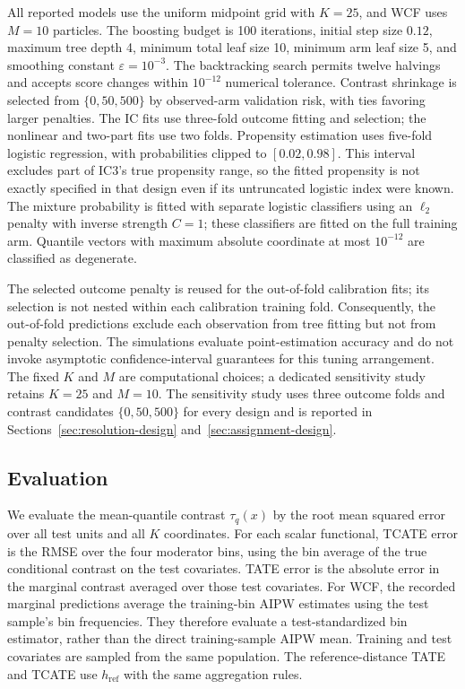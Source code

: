 \documentclass[11pt]{article}
\begin{document}
All reported models use the uniform midpoint grid with $K=25$, and WCF uses $M=10$ particles. The boosting budget is 100 iterations, initial step size $0.12$, maximum tree depth 4, minimum total leaf size 10, minimum arm leaf size 5, and smoothing constant $\varepsilon=10^{-3}$. The backtracking search permits twelve halvings and accepts score changes within $10^{-12}$ numerical tolerance. Contrast shrinkage is selected from $\{0,50,500\}$ by observed-arm validation risk, with ties favoring larger penalties. The IC fits use three-fold outcome fitting and selection; the nonlinear and two-part fits use two folds. Propensity estimation uses five-fold logistic regression, with probabilities clipped to $[0.02,0.98]$. This interval excludes part of IC3's true propensity range, so the fitted propensity is not exactly specified in that design even if its untruncated logistic index were known. The mixture probability is fitted with separate logistic classifiers using an $\ell_2$ penalty with inverse strength $C=1$; these classifiers are fitted on the full training arm. Quantile vectors with maximum absolute coordinate at most $10^{-12}$ are classified as degenerate.

The selected outcome penalty is reused for the out-of-fold calibration fits; its selection is not nested within each calibration training fold. Consequently, the out-of-fold predictions exclude each observation from tree fitting but not from penalty selection. The simulations evaluate point-estimation accuracy and do not invoke asymptotic confidence-interval guarantees for this tuning arrangement. The fixed $K$ and $M$ are computational choices; a dedicated sensitivity study retains $K=25$ and $M=10$. The sensitivity study uses three outcome folds and contrast candidates $\{0,50,500\}$ for every design and is reported in Sections~\ref{sec:resolution-design} and~\ref{sec:assignment-design}.

\subsection{Evaluation}\label{sec:metrics}

We evaluate the mean-quantile contrast $\tau_q(x)$ by the root mean squared error over all test units and all $K$ coordinates. For each scalar functional, TCATE error is the RMSE over the four moderator bins, using the bin average of the true conditional contrast on the test covariates. TATE error is the absolute error in the marginal contrast averaged over those test covariates. For WCF, the recorded marginal predictions average the training-bin AIPW estimates using the test sample's bin frequencies. They therefore evaluate a test-standardized bin estimator, rather than the direct training-sample AIPW mean. Training and test covariates are sampled from the same population. The reference-distance TATE and TCATE use $h_{\mathrm{ref}}$ with the same aggregation rules.
\end{document}
